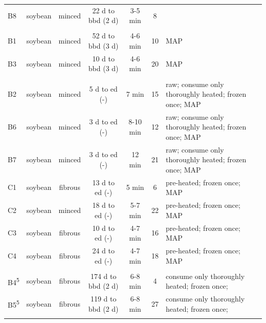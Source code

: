 \documentclass[preprint, 3p,
authoryear]{elsarticle} %
\begin{document}
\begin{ThreePartTable}
\begin{longtable}[b]{lccccc>{\raggedright\arraybackslash}p{12em}}
\hspace{1em}B8 & soybean & minced & 22 d to bbd (2 d) & 3-5 min & 8 & \\
\addlinespace[0.3em]
\multicolumn{7}{l}{\textit{Manufacturer 04}}\\
\hspace{1em}B1 & soybean & minced & 52 d to bbd (3 d) & 4-6 min & 10 & MAP\\
\hspace{1em}B3 & soybean & minced & 10 d to bbd (3 d) & 4-6 min & 20 & MAP\\
\addlinespace[0.3em]
\multicolumn{7}{l}{\textit{Manufacturer 05}}\\
\hspace{1em}B2 & soybean & minced & 5 d to ed (-) & 7 min & 15 & raw; consume only thoroughly heated; frozen once; MAP\\
\hspace{1em}B6 & soybean & minced & 3 d to ed (-) & 8-10 min & 12 & raw; consume only thoroughly heated; frozen once; MAP\\
\hspace{1em}B7 & soybean & minced & 3 d to ed (-) & 12 min & 21 & raw; consume only thoroughly heated; frozen once; MAP\\
\hspace{1em}C1 & soybean & fibrous & 13 d to ed (-) & 5 min & 6 & pre-heated; frozen once; MAP\\
\hspace{1em}C2 & soybean & minced & 18 d to ed (-) & 5-7 min & 22 & pre-heated; frozen once; MAP\\
\hspace{1em}C3 & soybean & fibrous & 10 d to ed (-) & 4-7 min & 16 & pre-heated; frozen once; MAP\\
\hspace{1em}C4 & soybean & fibrous & 24 d to ed (-) & 4-7 min & 18 & pre-heated; frozen once; MAP\\
\addlinespace[0.3em]
\multicolumn{7}{l}{\textit{Manufacturer 06}}\\
\hspace{1em}B4\textsuperscript{5} & soybean & fibrous & 174 d to bbd (2 d) & 6-8 min & 4 & consume only thoroughly heated; frozen once;\\
\hspace{1em}B5\textsuperscript{5} & soybean & fibrous & 119 d to bbd (2 d) & 6-8 min & 27 & consume only thoroughly heated; frozen once;\\
\addlinespace[0.3em]
\multicolumn{7}{l}{\textit{Manufacturer 07}}\\

\end{longtable}
\end{ThreePartTable}
\end{document}
